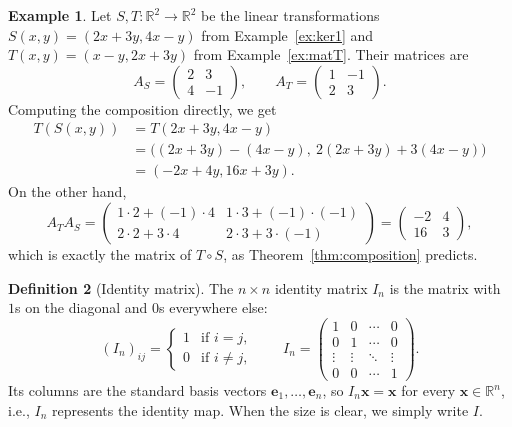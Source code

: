 \documentclass[11pt]{article}
\theoremstyle{definition}
\newtheorem{definition}{Definition}[section]
\newtheorem{example}[definition]{Example}
\theoremstyle{plain}
\theoremstyle{remark}
\begin{document}
\begin{example}
    Let $S, T: \mathbb{R}^2 \to \mathbb{R}^2$ be the linear transformations $S(x, y) = (2x + 3y, 4x - y)$ from Example~\ref{ex:ker1} and $T(x, y) = (x - y, 2x + 3y)$ from Example~\ref{ex:matT}. Their matrices are
    \[A_S = \begin{pmatrix}
        2 & 3 \\
        4 & -1
    \end{pmatrix}, \qquad A_T = \begin{pmatrix}
        1 & -1 \\
        2 & 3
    \end{pmatrix}.\]
    Computing the composition directly, we get
    \begin{align*}
        T(S(x, y)) &= T(2x + 3y, 4x - y) \\
        &= \big((2x + 3y) - (4x - y), \ 2(2x + 3y) + 3(4x - y)\big) \\
        &= (-2x + 4y, 16x + 3y).
    \end{align*}
    On the other hand,
    \[A_T A_S = \begin{pmatrix}
        1 \cdot 2 + (-1) \cdot 4 & 1 \cdot 3 + (-1) \cdot (-1) \\
        2 \cdot 2 + 3 \cdot 4 & 2 \cdot 3 + 3 \cdot (-1)
    \end{pmatrix} = \begin{pmatrix}
        -2 & 4 \\
        16 & 3
    \end{pmatrix},\]
    which is exactly the matrix of $T \circ S$, as Theorem~\ref{thm:composition} predicts.
\end{example}

\begin{definition}[Identity matrix]
    The $n \times n$ identity matrix $I_n$ is the matrix with $1$s on the diagonal and $0$s everywhere else:
    \[(I_n)_{ij} = \begin{cases}
        1 & \text{if } i = j, \\
        0 & \text{if } i \neq j,
    \end{cases} \qquad I_n = \begin{pmatrix}
        1 & 0 & \cdots & 0 \\
        0 & 1 & \cdots & 0 \\
        \vdots & \vdots & \ddots & \vdots \\
        0 & 0 & \cdots & 1
    \end{pmatrix}.\]
    Its columns are the standard basis vectors $\mathbf{e}_1, \ldots, \mathbf{e}_n$, so $I_n \mathbf{x} = \mathbf{x}$ for every $\mathbf{x} \in \mathbb{R}^n$, i.e., $I_n$ represents the identity map. When the size is clear, we simply write $I$.
\end{definition}
\end{document}
